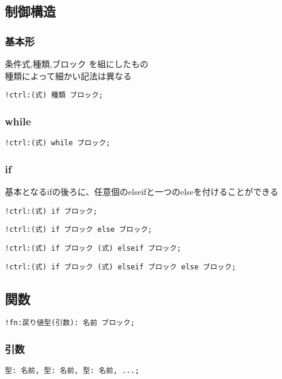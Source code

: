 \subsection{制御構造}
\subsubsection{基本形}
条件式,種類,ブロック を組にしたもの\\
種類によって細かい記法は異なる
\begin{lstlisting}[]
!ctrl:(式) 種類 ブロック;
\end{lstlisting}
\subsubsection{while}
\begin{lstlisting}[]
!ctrl:(式) while ブロック;
\end{lstlisting}
\subsubsection{if}
基本となるifの後ろに、任意個のelseifと一つのelseを付けることができる
\begin{lstlisting}[]
!ctrl:(式) if ブロック;
\end{lstlisting}
\begin{lstlisting}[]
!ctrl:(式) if ブロック else ブロック;
\end{lstlisting}
\begin{lstlisting}[]
!ctrl:(式) if ブロック (式) elseif ブロック;
\end{lstlisting}
\begin{lstlisting}[]
!ctrl:(式) if ブロック (式) elseif ブロック else ブロック;
\end{lstlisting}

\subsection{関数}

\begin{lstlisting}[]
!fn:戻り値型(引数): 名前 ブロック;
\end{lstlisting}

\subsubsection{引数}
\begin{lstlisting}[]
型: 名前, 型: 名前, 型: 名前, ...;
\end{lstlisting}
